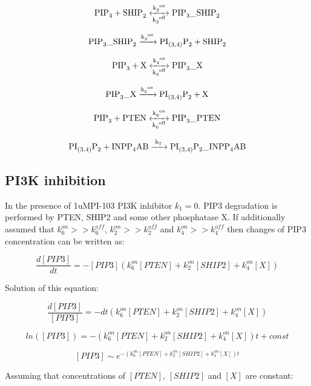 \documentclass[12pt]{article} %
\begin{document}
\begin{equation}
 \ce{PIP3 + SHIP2 <->[\ce{k_2^{on}}][\ce{k_2^{off}}] PIP3\_SHIP2}
 \label{eq:pip3_ship2_binding}
\end{equation}

\begin{equation}
 \ce{PIP3\_SHIP2 ->[\ce{k_3^{on}}] PI_{(3,4)}P2 + SHIP2}
 \label{eq:pi34p2_production_ship2}
\end{equation}

\begin{equation}
 \ce{PIP3 + X <->[\ce{k_4^{on}}][\ce{k_4^{off}}] PIP3\_X}
 \label{eq:pip3_X_binding}
\end{equation}

\begin{equation}
 \ce{PIP3\_X ->[\ce{k_5^{on}}] PI_{(3,4)}P2 + X}
 \label{eq:pi34p2_production_X}
\end{equation}

\begin{equation}
 \ce{PIP3 + PTEN <->[\ce{k_6^{on}}][\ce{k_6^{off}}] PIP3\_PTEN}
\end{equation}

\begin{equation}
 \ce{PI_{(3,4)}P2 + INPP4AB ->[\ce{k_7}] PI_{(3,4)}P2\_INPP4AB}
 \label{eq:pi34p2_degradation_inpp4ab}
\end{equation}

\subsection{PI3K inhibition} %

In the presence of 1uMPI-103 PI3K inhibitor \(k_1 = 0\). PIP3 degradation is performed by PTEN, SHIP2 and some other phosphatase X. If additionally assumed that \(k_6^{on}>>k_6^{off}\), \(k_2^{on}>>k_2^{off}\) and \(k_4^{on}>>k_4^{off}\) then changes of PIP3 concentration can be written as:

\[
 \frac{d [PIP3]}{d t} = -[PIP3](k_6^{on}[PTEN] + k_2^{on}[SHIP2] + k_4^{on}[X])
\]

Solution of this equation:

\[
 \frac{d [PIP3]}{[PIP3]} = -dt(k_6^{on}[PTEN] + k_2^{on}[SHIP2] + k_4^{on}[X])
\]

\[
 ln([PIP3]) = -(k_6^{on}[PTEN] + k_2^{on}[SHIP2] + k_4^{on}[X])t + const
\]

\[
 [PIP3] \sim e^{-(k_6^{on}[PTEN] + k_2^{on}[SHIP2] + k_4^{on}[X])t}
\]

Assuming that concentrations of \([PTEN]\), \([SHIP2]\) and \([X]\) are constant:
\end{document}
